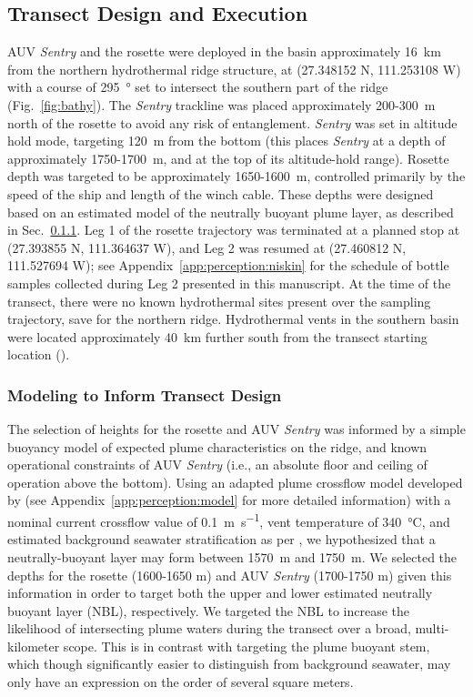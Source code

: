 \subsection{Transect Design and Execution}
AUV \emph{Sentry} and the rosette were deployed in the basin approximately \SI{16}{\kilo\meter} from the northern hydrothermal ridge structure, at (27.348152 N, 111.253108 W) with a course of \SI{295}{\degree} set to intersect the southern part of the ridge (Fig.~\ref{fig:bathy}). The \emph{Sentry} trackline was placed approximately 200-\SI{300}{\meter} north of the rosette to avoid any risk of entanglement. \emph{Sentry} was set in altitude hold mode, targeting \SI{120}{\meter} from the bottom (this places \emph{Sentry} at a depth of approximately 1750-\SI{1700}{\meter}, and at the top of its altitude-hold range). Rosette depth was targeted to be approximately 1650-\SI{1600}{\meter}, controlled primarily by the speed of the ship and length of the winch cable. These depths were designed based on an estimated model of the neutrally buoyant plume layer, as described in Sec.~\ref{sec:model}. Leg 1 of the rosette trajectory was terminated at a planned stop at (27.393855 N, 111.364637 W), and Leg 2 was resumed at (27.460812 N, 111.527694 W); see Appendix~\ref{app:perception:niskin} for the schedule of bottle samples collected during Leg 2 presented in this manuscript. At the time of the transect, there were no known hydrothermal sites present over the sampling trajectory, save for the northern ridge. Hydrothermal vents in the southern basin were located approximately \SI{40}{\kilo\meter} further south from the transect starting location (\cite{teske2016guaymas}).

\subsubsection{Modeling to Inform Transect Design}
\label{sec:model}
The selection of heights for the rosette and AUV \emph{Sentry} was informed by a simple buoyancy model of expected plume characteristics on the ridge, and known operational constraints of AUV \emph{Sentry} (i.e., an absolute floor and ceiling of operation above the bottom). Using an adapted plume crossflow model developed by \cite{tohidi2016highly} (see Appendix~\ref{app:perception:model} for more detailed information) with a nominal current crossflow value of \SI{0.1}{\meter\per\second}, vent temperature of \SI{340}{\celsius}, and estimated background seawater stratification as per \cite{speer1989model}, we hypothesized that a neutrally-buoyant layer may form between \SI{1570}{\meter} and \SI{1750}{\meter}. We selected the depths for the rosette (1600-1650 m) and AUV \emph{Sentry} (1700-1750 m) given this information in order to target both the upper and lower estimated neutrally buoyant layer (NBL), respectively. We targeted the NBL to increase the likelihood of intersecting plume waters during the transect over a broad, multi-kilometer scope. This is in contrast with targeting the plume buoyant stem, which though significantly easier to distinguish from background seawater, may only have an expression on the order of several square meters.

